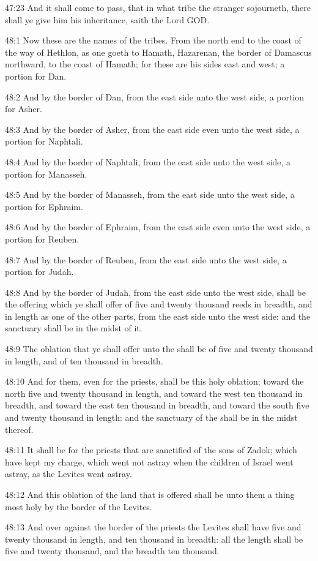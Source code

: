 47:23 And it shall come to pass, that in what tribe the stranger
sojourneth, there shall ye give him his inheritance, saith the Lord
GOD.

48:1 Now these are the names of the tribes. From the north end to the
coast of the way of Hethlon, as one goeth to Hamath, Hazarenan, the
border of Damascus northward, to the coast of Hamath; for these are
his sides east and west; a portion for Dan.

48:2 And by the border of Dan, from the east side unto the west side,
a portion for Asher.

48:3 And by the border of Asher, from the east side even unto the west
side, a portion for Naphtali.

48:4 And by the border of Naphtali, from the east side unto the west
side, a portion for Manasseh.

48:5 And by the border of Manasseh, from the east side unto the west
side, a portion for Ephraim.

48:6 And by the border of Ephraim, from the east side even unto the
west side, a portion for Reuben.

48:7 And by the border of Reuben, from the east side unto the west
side, a portion for Judah.

48:8 And by the border of Judah, from the east side unto the west
side, shall be the offering which ye shall offer of five and twenty
thousand reeds in breadth, and in length as one of the other parts,
from the east side unto the west side: and the sanctuary shall be in
the midst of it.

48:9 The oblation that ye shall offer unto the \LORD shall be of five
and twenty thousand in length, and of ten thousand in breadth.

48:10 And for them, even for the priests, shall be this holy oblation;
toward the north five and twenty thousand in length, and toward the
west ten thousand in breadth, and toward the east ten thousand in
breadth, and toward the south five and twenty thousand in length: and
the sanctuary of the \LORD shall be in the midst thereof.

48:11 It shall be for the priests that are sanctified of the sons of
Zadok; which have kept my charge, which went not astray when the
children of Israel went astray, as the Levites went astray.

48:12 And this oblation of the land that is offered shall be unto them
a thing most holy by the border of the Levites.

48:13 And over against the border of the priests the Levites shall
have five and twenty thousand in length, and ten thousand in breadth:
all the length shall be five and twenty thousand, and the breadth ten
thousand.

